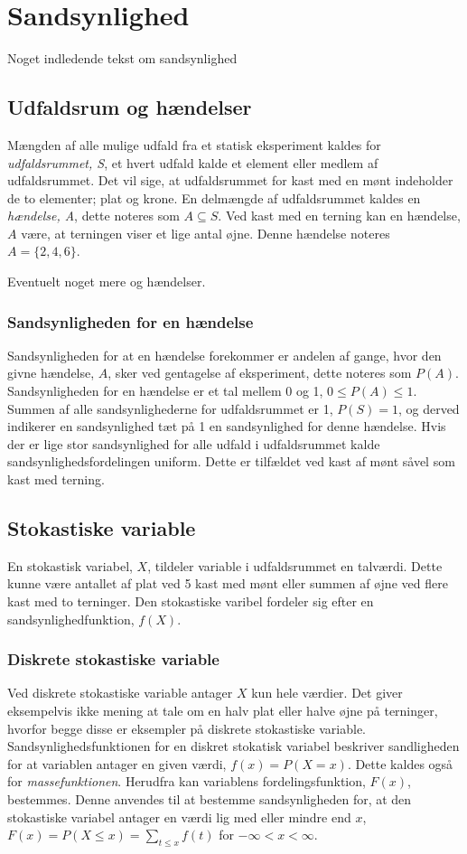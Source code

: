 \section{Sandsynlighed}
Noget indledende tekst om sandsynlighed

\subsection{Udfaldsrum og hændelser}
Mængden af alle mulige udfald fra et statisk eksperiment kaldes for \emph{udfaldsrummet,  S}, et hvert udfald kalde et element eller medlem af udfaldsrummet. Det vil sige, at udfaldsrummet for kast med en mønt indeholder de to elementer; plat og krone.
\newline
En delmængde af udfaldsrummet kaldes en \emph{hændelse, A}, dette noteres som $A \subseteq S$. Ved kast med en terning kan en hændelse, $A$ være, at terningen viser et lige antal øjne. Denne hændelse noteres $A=\{2,4,6\}$.

Eventuelt noget mere og hændelser.

\subsubsection{Sandsynligheden for en hændelse}
Sandsynligheden for at en hændelse forekommer er andelen af gange, hvor den givne hændelse, $A$, sker ved gentagelse af eksperiment, dette noteres som $P(A)$. Sandsynligheden for en hændelse er et tal mellem 0 og 1, $0 \le P(A) \le 1$. Summen af alle sandsynlighederne for udfaldsrummet er 1, $P(S)=1$, og derved indikerer en sandsynlighed tæt på 1 en sandsynlighed for denne hændelse.
\newline
Hvis der er lige stor sandsynlighed for alle udfald i udfaldsrummet kalde sandsynlighedsfordelingen uniform. Dette er tilfældet ved kast af mønt såvel som kast med terning.


\subsection{Stokastiske variable}
En stokastisk variabel, $X$, tildeler variable i udfaldsrummet en talværdi. Dette kunne være antallet af plat ved 5 kast med mønt eller summen af øjne ved flere kast med to terninger. Den stokastiske varibel fordeler sig efter en sandsynlighedfunktion, $f(X)$.

\subsubsection{Diskrete stokastiske variable}
Ved diskrete stokastiske variable antager $X$ kun hele værdier. Det giver eksempelvis ikke mening at tale om en halv plat eller halve øjne på terninger, hvorfor begge disse er eksempler på diskrete stokastiske variable.
Sandsynlighedsfunktionen for en diskret stokatisk variabel beskriver sandligheden for at variablen antager en given værdi, $f(x)=P(X=x)$. Dette kaldes også for \emph{massefunktionen}.
Herudfra kan variablens fordelingsfunktion, $F(x)$, bestemmes. Denne anvendes til at bestemme sandsynligheden for, at den stokastiske variabel antager en værdi lig med eller mindre end $x$, $F(x)=P(X \le x)=\sum_{t \le x}^{} f(t)$ for $-\infty < x < \infty$.


